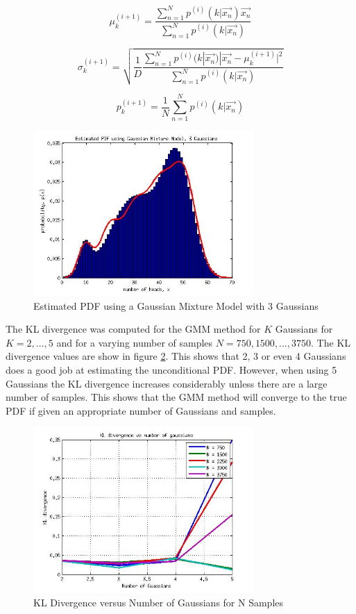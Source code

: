 \documentclass[journal]{IEEEtran}
\begin{document}
\begin{equation}
\label{eq:mstep_1}
\mu_k^{(i+1)} = \frac
{\sum_{n=1}^{N}{p^{(i)}(k|\vec{x_n})\vec{x_n}}}
{\sum_{n=1}^{N}{p^{(i)}(k|\vec{x_n})}}
\end{equation}

\begin{equation}
\label{eq:mstep_2}
\sigma_k^{(i+1)} = \sqrt{
\frac{1}{D}
\frac{\sum_{n=1}^N{p^{(i)}(k|\vec{x_n})|\vec{x_n}-\mu_k^{(i+1)}|^2}}
{\sum_{n=1}^N{p^{(i)}(k|\vec{x_n})}}
}
\end{equation}

\begin{equation}
\label{eq:mstep_3}
p_k^{(i+1)} = \frac{1}{N}\sum_{n=1}^N{p^{(i)}(k|\vec{x_n})}
\end{equation}

\begin{figure}
\centering
\includegraphics[width=3.3in]{../images/PDF_GMM_3.jpg}
\caption{Estimated PDF using a Gaussian Mixture Model with 3 Gaussians}
\label{fig:PDF_GMM_3}
\end{figure}

\par The KL divergence was computed for the GMM method for \(K\) Gaussians for \(K = 2,\ldots,5\) and for a varying number of samples \(N = 750, 1500, \ldots, 3750\). The KL divergence values are show in figure \ref{fig:KL_GMM}. This shows that 2, 3 or even 4 Gaussians does a good job at estimating the unconditional PDF. However, when using 5 Gaussians the KL divergence increases considerably unless there are a large number of samples. This shows that the GMM method will converge to the true PDF if given an appropriate number of Gaussians and samples.

\begin{figure}
\centering
\includegraphics[width=3.3in]{../images/KL_GMM.jpg}
\caption{KL Divergence versus Number of Gaussians for N Samples}
\label{fig:KL_GMM}
\end{figure}
\end{document}
